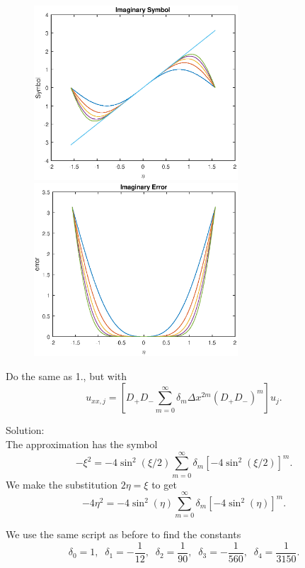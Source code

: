 \begin{figure}[ht]
\centering
\includegraphics[width=3in]{imag_sym1}
\includegraphics[width=3in]{imag_err1}
\end{figure}

\item Do the same as 1., but with 
$$u_{xx,j}=\left[D_+D_-\sum_{m=0}^\infty \delta_m\Delta x^{2m}(D_+D_-)^m\right]u_j.$$

Solution:\\

The approximation has the symbol
$$-\xi^2 = -4\sin^2(\xi/2)\sum_{m=0}^\infty \delta_m[-4\sin^2(\xi/2)]^m.$$
We make the substitution $2\eta=\xi$ to get
$$-4\eta^2 = -4\sin^2(\eta)\sum_{m=0}^\infty\delta_m[-4\sin^2(\eta)]^m.$$

We use the same script as before to find the constants
$$\delta_0=1,\;\; \delta_1 = -\frac{1}{12},\;\;\delta_2 = \frac{1}{90},\;\;\delta_3 = -\frac{1}{560},\;\;\delta_4 = \frac{1}{3150}.$$

